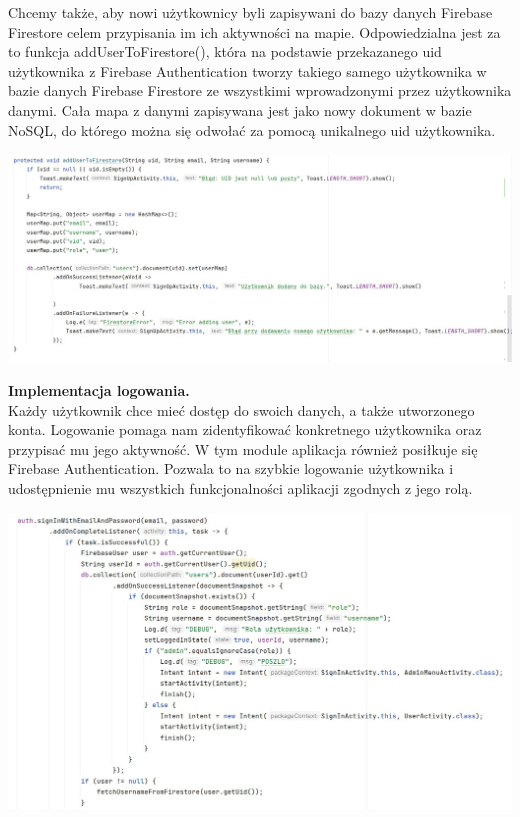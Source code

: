 Chcemy także, aby nowi użytkownicy byli zapisywani do bazy danych Firebase Firestore celem przypisania im ich aktywności na mapie. Odpowiedzialna jest za to funkcja addUserToFirestore(), która na podstawie przekazanego uid użytkownika z Firebase Authentication tworzy takiego samego użytkownika w bazie danych Firebase Firestore ze wszystkimi wprowadzonymi przez użytkownika danymi. Cała mapa z danymi zapisywana jest jako nowy dokument w bazie NoSQL, do którego można się odwołać za pomocą unikalnego uid użytkownika.\\
\noindent
\begin{minipage}{\linewidth}
    \label{lst:addtofirestore}
    \centering
    \includegraphics[width=0.8\linewidth]{img/kod/imp-addtofs.jpg}
\end{minipage}
\textbf{Implementacja logowania.}\\
Każdy użytkownik chce mieć dostęp do swoich danych, a także utworzonego konta. Logowanie pomaga nam zidentyfikować konkretnego użytkownika oraz przypisać mu jego aktywność. W tym module aplikacja również posiłkuje się Firebase Authentication. Pozwala to na szybkie logowanie użytkownika i udostępnienie mu wszystkich funkcjonalności aplikacji zgodnych z jego rolą.\\
\noindent
\begin{minipage}{\linewidth}
    \label{lst:login}
    \centering
    \includegraphics[width=0.8\linewidth]{img/kod/imp-login1.jpg}
\end{minipage}


